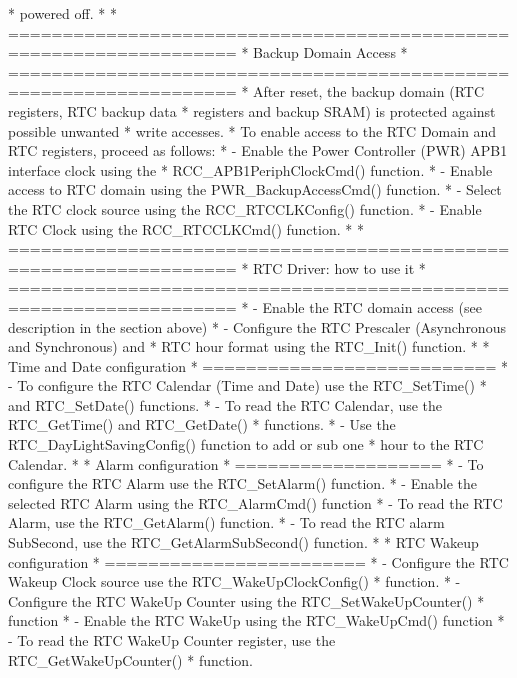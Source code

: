 \begin{DoxyVerb}
*                powered off.
*
*          ===================================================================
*                                   Backup Domain Access
*          ===================================================================
*          After reset, the backup domain (RTC registers, RTC backup data 
*          registers and backup SRAM) is protected against possible unwanted 
*          write accesses. 
*          To enable access to the RTC Domain and RTC registers, proceed as follows:
*            - Enable the Power Controller (PWR) APB1 interface clock using the
*              RCC_APB1PeriphClockCmd() function.
*            - Enable access to RTC domain using the PWR_BackupAccessCmd() function.
*            - Select the RTC clock source using the RCC_RTCCLKConfig() function.
*            - Enable RTC Clock using the RCC_RTCCLKCmd() function.
*
*          ===================================================================
*                                   RTC Driver: how to use it
*          ===================================================================
*            - Enable the RTC domain access (see description in the section above)
*            - Configure the RTC Prescaler (Asynchronous and Synchronous) and
*              RTC hour format using the RTC_Init() function.
*
*          Time and Date configuration
*          ===========================
*            - To configure the RTC Calendar (Time and Date) use the RTC_SetTime()
*              and RTC_SetDate() functions.
*            - To read the RTC Calendar, use the RTC_GetTime() and RTC_GetDate()
*              functions.
*            - Use the RTC_DayLightSavingConfig() function to add or sub one
*              hour to the RTC Calendar.    
*
*          Alarm configuration
*          ===================
*            - To configure the RTC Alarm use the RTC_SetAlarm() function.
*            - Enable the selected RTC Alarm using the RTC_AlarmCmd() function
*            - To read the RTC Alarm, use the RTC_GetAlarm() function.
*            - To read the RTC alarm SubSecond, use the RTC_GetAlarmSubSecond() function.
*
*          RTC Wakeup configuration
*          ========================
*            - Configure the RTC Wakeup Clock source use the RTC_WakeUpClockConfig()
*              function.
*            - Configure the RTC WakeUp Counter using the RTC_SetWakeUpCounter() 
*              function  
*            - Enable the RTC WakeUp using the RTC_WakeUpCmd() function  
*            - To read the RTC WakeUp Counter register, use the RTC_GetWakeUpCounter() 
*              function.

\end{DoxyVerb}

